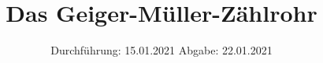 

\subject{703}
\title{Das Geiger-Müller-Zählrohr}
\date{%
  Durchführung: 15.01.2021
  \hspace{3em}
  Abgabe: 22.01.2021
}



\maketitle
\thispagestyle{empty}
\tableofcontents
\newpage







\printbibliography{}


